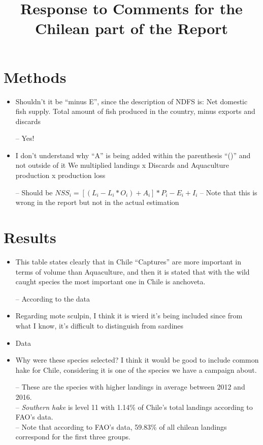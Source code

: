 \documentclass[]{article}
\title{Response to Comments for the Chilean part of the Report}
\author{}
\date{}
\begin{document}
\maketitle

\section{Methods}\label{methods}

\begin{itemize}
\item
  Shouldn't it be ``minus E'', since the description of NDFS is: Net
  domestic fish supply. Total amount of fish produced in the country,
  minus exports and discards

  -- Yes!
\item
  I don't understand why ``A'' is being added within the parenthesis
  ``()'' and not outside of it We multiplied landings x Discards and
  Aquaculture production x production loss

  -- Should be \(NSS_i=[(L_i-L_i*O_{i})+A_i]*P_{i}-E_i+I_i\) -- Note
  that this is wrong in the report but not in the actual estimation
\end{itemize}

\section{Results}\label{results}

\begin{itemize}
\item
  This table states clearly that in Chile ``Captures'' are more
  important in terms of volume than Aquaculture, and then it is stated
  that with the wild caught species the most important one in Chile is
  anchoveta.

  -- According to the data
\item
  Regarding mote sculpin, I think it is wierd it's being included since
  from what I know, it's difficult to distinguish from sardines
\item
  Data
\item
  Why were these species selected? I think it would be good to include
  common hake for Chile, considering it is one of the species we have a
  campaign about.

  -- These are the species with higher landings in average between 2012
  and 2016.\\
  -- \emph{Southern hake} is level 11 with 1.14\% of Chile's total
  landings according to FAO's data.\\
  -- Note that according to FAO's data, 59.83\% of all chilean landings
  correspond for the first three groups.
\end{itemize}
\end{document}
